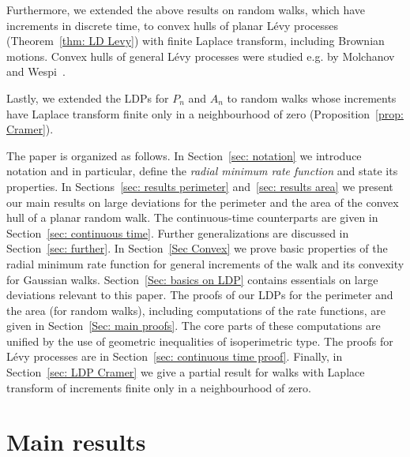 \documentclass[AHL,Unicode,published]{cedram}
\begin{document}
Furthermore, we extended the above results on random walks, which have increments in discrete time, to convex hulls of planar L\'evy processes (Theorem~\ref{thm: LD Levy}) with finite Laplace transform, including Brownian motions. Convex hulls of general L\'evy processes were studied e.g. by Molchanov and Wespi~\cite{MolchanovWespi}.

Lastly, we extended the LDPs for $P_n$ and $A_n$ to random walks whose increments have Laplace transform finite only in a neighbourhood of zero (Proposition~\ref{prop: Cramer}).

The paper is organized as follows. In Section~\ref{sec: notation} we introduce notation and in particular, define the \emph{radial minimum rate function} and state its properties. In Sections~\ref{sec: results perimeter} and~\ref{sec: results area} we present our main results on large deviations for the perimeter and the area of the convex hull of a planar random walk. The continuous-time counterparts are given in Section~\ref{sec: continuous time}. Further generalizations are discussed in Section~\ref{sec: further}. In Section~\ref{Sec Convex} we prove basic properties of the radial minimum rate function for general increments of the walk and its convexity for Gaussian walks. Section~\ref{Sec: basics on LDP} contains essentials on large deviations relevant to this paper. The proofs of our LDPs for the perimeter and the area (for random walks), including computations of the rate functions, are given in Section~\ref{Sec: main proofs}. The core parts of these computations are unified by the use of geometric inequalities of isoperimetric type. The proofs for L\'evy processes are in Section~\ref{sec: continuous time proof}. Finally, in Section~\ref{sec: LDP Cramer} we give a partial result for walks with Laplace transform of increments finite only in a neighbourhood of zero.

\section{Main results}
\end{document}
